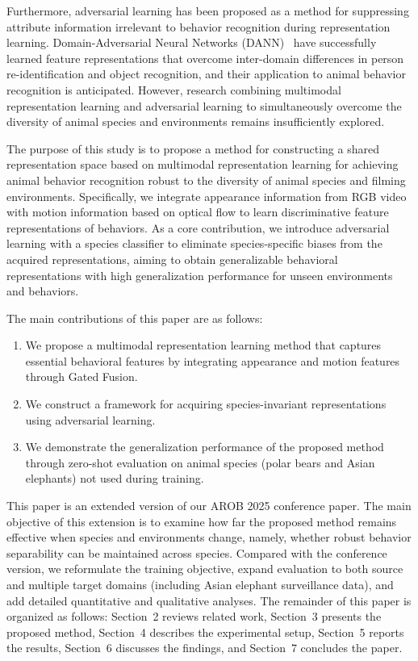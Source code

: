 \documentclass[twocolumn]{svjour3}
\begin{document}
Furthermore, adversarial learning has been proposed as a method for suppressing attribute information irrelevant to behavior recognition during representation learning.
Domain-Adversarial Neural Networks (DANN)~\cite{ganin2016domain} have successfully learned feature representations that overcome inter-domain differences in person re-identification and object recognition, and their application to animal behavior recognition is anticipated.
However, research combining multimodal representation learning and adversarial learning to simultaneously overcome the diversity of animal species and environments remains insufficiently explored.

The purpose of this study is to propose a method for constructing a shared representation space based on multimodal representation learning for achieving animal behavior recognition robust to the diversity of animal species and filming environments.
Specifically, we integrate appearance information from RGB video with motion information based on optical flow to learn discriminative feature representations of behaviors.
As a core contribution, we introduce adversarial learning with a species classifier to eliminate species-specific biases from the acquired representations, aiming to obtain generalizable behavioral representations with high generalization performance for unseen environments and behaviors.

The main contributions of this paper are as follows:
\begin{enumerate}
  \item We propose a multimodal representation learning method that captures essential behavioral features by integrating appearance and motion features through Gated Fusion.
  \item We construct a framework for acquiring species-invariant representations using adversarial learning.
  \item We demonstrate the generalization performance of the proposed method through zero-shot evaluation on animal species (polar bears and Asian elephants) not used during training.
\end{enumerate}

This paper is an extended version of our AROB 2025 conference paper.
The main objective of this extension is to examine how far the proposed method remains effective when species and environments change, namely, whether robust behavior separability can be maintained across species.
Compared with the conference version, we reformulate the training objective, expand evaluation to both source and multiple target domains (including Asian elephant surveillance data), and add detailed quantitative and qualitative analyses.
The remainder of this paper is organized as follows: Section~2 reviews related work, Section~3 presents the proposed method, Section~4 describes the experimental setup, Section~5 reports the results, Section~6 discusses the findings, and Section~7 concludes the paper.
\end{document}
